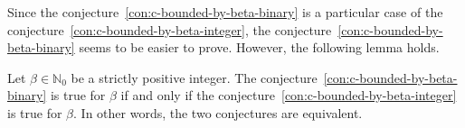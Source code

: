 Since the conjecture~\ref{con:c-bounded-by-beta-binary} is a particular case of the conjecture~\ref{con:c-bounded-by-beta-integer}, the conjecture~\ref{con:c-bounded-by-beta-binary} seems to be easier to prove.
However, the following lemma holds.

\begin{lemma}
    \label{lem:pm_graphs_with_integer_weights}
    Let $\beta \in \mathbb{N}_0$ be a strictly positive integer.
    The conjecture~\ref{con:c-bounded-by-beta-binary} is true for $\beta$ if and only if the conjecture~\ref{con:c-bounded-by-beta-integer} is true for $\beta$.
    In other words, the two conjectures are equivalent.
\end{lemma}

